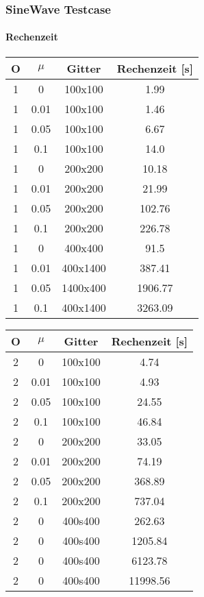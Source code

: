\documentclass[
	11pt, %
	aspectratio=169, %
]{beamer}
\begin{document}
\begin{frame}
	\frametitle{SineWave Testcase}
	\framesubtitle{Rechenzeit}
	\begin{table}[h]
	\begin{tabular*}{0.4\textwidth}{|c|c|c|c|}
		\hline
		O & $\mu$ & Gitter & Rechenzeit [s]\\
		\hline
		1 & 0 & 100x100 & 1.99\\
		\hline
		1 & 0.01 & 100x100 & 1.46\\
		\hline
		1 & 0.05 & 100x100 & 6.67\\
		\hline
		1 & 0.1 & 100x100 & 14.0\\
		\hline
		1 & 0 & 200x200 & 10.18\\
		\hline
		1 & 0.01 & 200x200 & 21.99\\
		\hline
		1 & 0.05 & 200x200 & 102.76\\
		\hline
		1 & 0.1 & 200x200 & 226.78\\
		\hline
		1 & 0 & 400x400 & 91.5\\
		\hline
		1 & 0.01 & 400x1400 & 387.41\\
		\hline
		1 & 0.05 & 1400x400 & 1906.77\\
		\hline
		1 & 0.1 & 400x1400 & 3263.09\\
		\hline
	\end{tabular*}
	\hspace{0.05\textwidth}
	\begin{tabular*}{0.4\textwidth}{@{\extracolsep{\fill}}|c|c|c|c|}
		\hline
		O & $\mu$ & Gitter & Rechenzeit [s]\\
		\hline
		2 & 0 & 100x100 & 4.74\\
		\hline
		2 & 0.01 & 100x100 & 4.93\\
		\hline
		2 & 0.05 & 100x100 & 24.55\\
		\hline
		2 & 0.1 & 100x100 & 46.84\\
		\hline
		2 & 0 & 200x200 & 33.05\\
		\hline
		2 & 0.01 & 200x200 & 74.19\\
		\hline
		2 & 0.05 & 200x200 & 368.89\\
		\hline
		2 & 0.1 & 200x200 & 737.04\\
		\hline
		2 & 0 & 400s400 & 262.63 \\
		\hline
		2 & 0 & 400s400 & 1205.84 \\
		\hline
		2 & 0 & 400s400 & 6123.78 \\
		\hline
		2 & 0 & 400s400 & 11998.56 \\
		\hline
		\end{tabular*}
	\end{table}


\end{frame}
\end{document}
